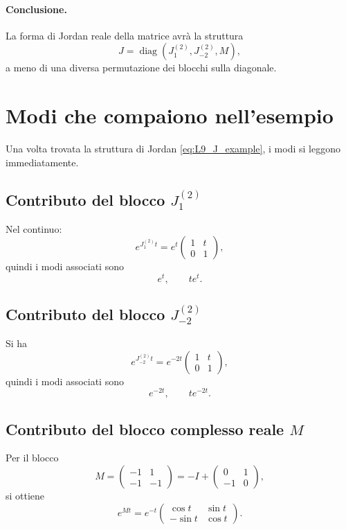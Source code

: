 \paragraph{Conclusione.}
La forma di Jordan reale della matrice avrà la struttura
\begin{equation}
J=
\operatorname{diag}
\left(
J_1^{(2)},
J_{-2}^{(2)},
M
\right),
\label{eq:L9_J_example}
\end{equation}
a meno di una diversa permutazione dei blocchi sulla diagonale.

\section{Modi che compaiono nell'esempio}

Una volta trovata la struttura di Jordan \eqref{eq:L9_J_example}, i modi si leggono immediatamente.

\subsection{Contributo del blocco \texorpdfstring{$J_1^{(2)}$}{J1}}

Nel continuo:
\[
e^{J_1^{(2)}t}
=
e^t
\begin{pmatrix}
1 & t\\
0 & 1
\end{pmatrix},
\]
quindi i modi associati sono
\[
e^t,
\qquad
t e^t.
\]

\subsection{Contributo del blocco \texorpdfstring{$J_{-2}^{(2)}$}{J-2}}

Si ha
\[
e^{J_{-2}^{(2)}t}
=
e^{-2t}
\begin{pmatrix}
1 & t\\
0 & 1
\end{pmatrix},
\]
quindi i modi associati sono
\[
e^{-2t},
\qquad
t e^{-2t}.
\]

\subsection{Contributo del blocco complesso reale \texorpdfstring{$M$}{M}}

Per il blocco
\[
M=
\begin{pmatrix}
-1 & 1\\
-1 & -1
\end{pmatrix}
=
- I + 
\begin{pmatrix}
0 & 1\\
-1 & 0
\end{pmatrix},
\]
si ottiene
\[
e^{Mt}
=
e^{-t}
\begin{pmatrix}
\cos t & \sin t\\
-\sin t & \cos t
\end{pmatrix}.
\]

